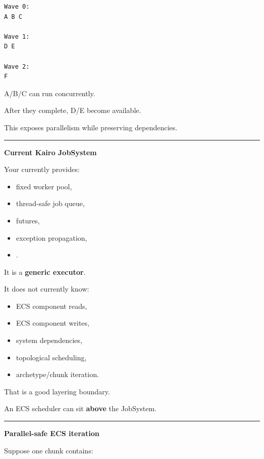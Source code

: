 \begin{verbatim}
Wave 0:
A B C

Wave 1:
D E

Wave 2:
F
\end{verbatim}

A/B/C can run concurrently.

After they complete, D/E become available.

This exposes parallelism while preserving dependencies.

\begin{center}\rule{0.5\linewidth}{0.5pt}\end{center}

\textbf{Current Kairo JobSystem}

Your  currently provides:

\begin{itemize}
\tightlist
\item
  fixed worker pool,
\item
  thread-safe job queue,
\item
  futures,
\item
  exception propagation,
\item
  .
\end{itemize}

It is a \textbf{generic executor}.

It does not currently know:

\begin{itemize}
\tightlist
\item
  ECS component reads,
\item
  ECS component writes,
\item
  system dependencies,
\item
  topological scheduling,
\item
  archetype/chunk iteration.
\end{itemize}

That is a good layering boundary.

An ECS scheduler can sit \textbf{above} the JobSystem.

\begin{center}\rule{0.5\linewidth}{0.5pt}\end{center}

\textbf{Parallel-safe ECS iteration}

Suppose one chunk contains:

